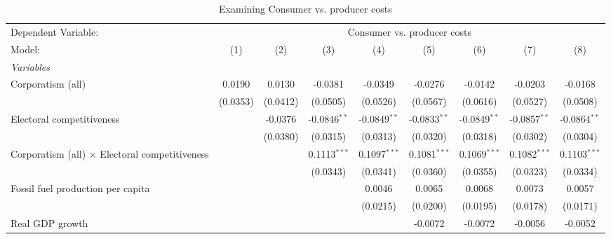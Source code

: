 
\begin{table}[htbp]
   \caption{Examining Consumer vs. producer costs}
   \centering
   \begin{tabular}{lcccccccc}
      \tabularnewline \midrule \midrule
      Dependent Variable: & \multicolumn{8}{c}{Consumer vs. producer costs}\\
      Model:                                                & (1)      & (2)      & (3)            & (4)            & (5)            & (6)            & (7)            & (8)\\  
      \midrule
      \emph{Variables}\\
      Corporatism (all)                                     & 0.0190   & 0.0130   & -0.0381        & -0.0349        & -0.0276        & -0.0142        & -0.0203        & -0.0168\\   
                                                            & (0.0353) & (0.0412) & (0.0505)       & (0.0526)       & (0.0567)       & (0.0616)       & (0.0527)       & (0.0508)\\   
      Electoral competitiveness                             &          & -0.0376  & -0.0846$^{**}$ & -0.0849$^{**}$ & -0.0833$^{**}$ & -0.0849$^{**}$ & -0.0857$^{**}$ & -0.0864$^{**}$\\   
                                                            &          & (0.0380) & (0.0315)       & (0.0313)       & (0.0320)       & (0.0318)       & (0.0302)       & (0.0304)\\   
      Corporatism (all) $\times$ Electoral competitiveness  &          &          & 0.1113$^{***}$ & 0.1097$^{***}$ & 0.1081$^{***}$ & 0.1069$^{***}$ & 0.1082$^{***}$ & 0.1103$^{***}$\\   
                                                            &          &          & (0.0343)       & (0.0341)       & (0.0360)       & (0.0355)       & (0.0323)       & (0.0334)\\   
      Fossil fuel production per capita                     &          &          &                & 0.0046         & 0.0065         & 0.0068         & 0.0073         & 0.0057\\   
                                                            &          &          &                & (0.0215)       & (0.0200)       & (0.0195)       & (0.0178)       & (0.0171)\\   
      Real GDP growth                                       &          &          &                &                & -0.0072        & -0.0072        & -0.0056        & -0.0052\\   

\end{tabular}
\end{table}
